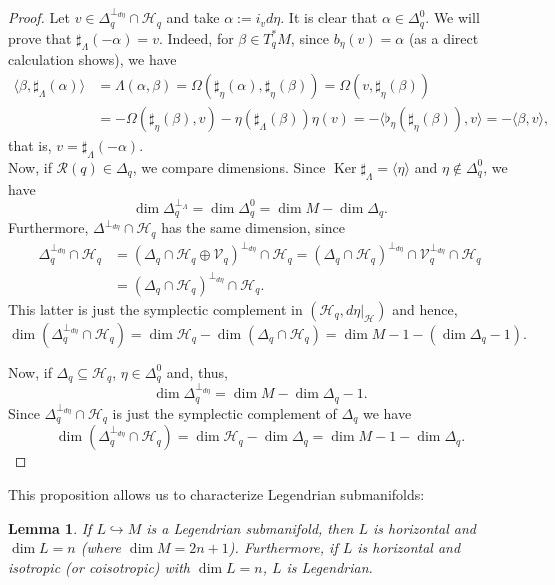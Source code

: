\documentclass[12pt]{article}
\newtheorem{lemma}{Lemma}[section]
\renewcommand{\dim}{\operatorname{dim}}
\renewcommand{\ker}{\operatorname{Ker}}
\begin{document}
\begin{proof} Let $v \in \Delta_q^{\perp_{d\eta}}\cap \mathcal{H}_q$ and take $\alpha := i_v d \eta$. It is clear that $\alpha \in \Delta_q^0$. We will prove that $\sharp_\Lambda(-\alpha) = v$. Indeed, for $\beta \in T^*_qM$, since $b_\eta(v) = \alpha$ (as a direct calculation shows), we have
\begin{align*}
\langle \beta, \sharp_\Lambda(\alpha) \rangle &= \Lambda(\alpha, \beta) = \Omega(\sharp_\eta(\alpha), \sharp_\eta(\beta)) = \Omega(v, \sharp_\eta(\beta)) \\
&= -\Omega( \sharp_\eta(\beta),v) - \eta(\sharp_\Lambda(\beta))\eta(v) =- \langle \flat_\eta(\sharp_\eta(\beta)), v\rangle = -\langle \beta, v \rangle,
\end{align*}
that is, $v = \sharp_\Lambda(-\alpha)$.\\

Now, if $\mathcal{R}(q) \in \Delta_q$, we compare dimensions. Since $\ker \sharp_\Lambda = \langle \eta\rangle$ and $\eta \not \in \Delta_q^0$, we have $$\dim \Delta_q^{\perp_\Lambda} = \dim \Delta_q^0 = \dim M - \dim \Delta_q.$$
Furthermore, $\Delta^{\perp_{d\eta}}\cap \mathcal{H}_q$ has the same dimension, since
\begin{align*} 
\Delta_q^{\perp_{d\eta}} \cap \mathcal{H}_q &= (\Delta_q \cap \mathcal{H}_q \oplus \mathcal{V}_q)^{\perp_{d\eta}} \cap \mathcal{H}_q = (\Delta_q \cap \mathcal{H}_q)^{\perp_{d\eta}} \cap \mathcal{V}_q^{\perp_{d\eta}} \cap \mathcal{H}_q\\ & = (\Delta_q \cap \mathcal{H}_q)^{\perp_{d\eta}} \cap \mathcal{H}_q.
\end{align*}
This latter is just the symplectic complement in $(\mathcal{H}_q, d\eta |_{\mathcal{H}})$ and hence, $$\dim (\Delta_q^{\perp_{d\eta}}\cap \mathcal{H}_q) = \dim \mathcal{H}_q - \dim (\Delta_q \cap \mathcal{H}_q) = \dim M - 1 - (\dim \Delta_q - 1).$$

Now, if $\Delta_q \subseteq \mathcal{H}_q$, $\eta \in \Delta_q^0$ and, thus, $$\dim \Delta_q^{\perp_{d\eta}} = \dim M - \dim \Delta_q - 1.$$
Since $\Delta_q^{\perp_{d\eta}} \cap \mathcal{H}_q$ is just the symplectic complement of $\Delta_q$ we have $$\dim (\Delta_q^{\perp_{d\eta}} \cap \mathcal{H}_q) = \dim \mathcal{H}_q - \dim \Delta_q = \dim M - 1 - \dim \Delta_q.$$
\end{proof}
This proposition allows us to characterize Legendrian submanifolds:\\
\begin{lemma} If $L\hookrightarrow M$ is a Legendrian submanifold, then $L$ is horizontal and $\dim L = n$ (where $\dim M = 2n+1$). Furthermore, if $L$ is horizontal and isotropic (or coisotropic) with $\dim L = n$, $L$ is Legendrian.
\end{lemma}
\end{document}
